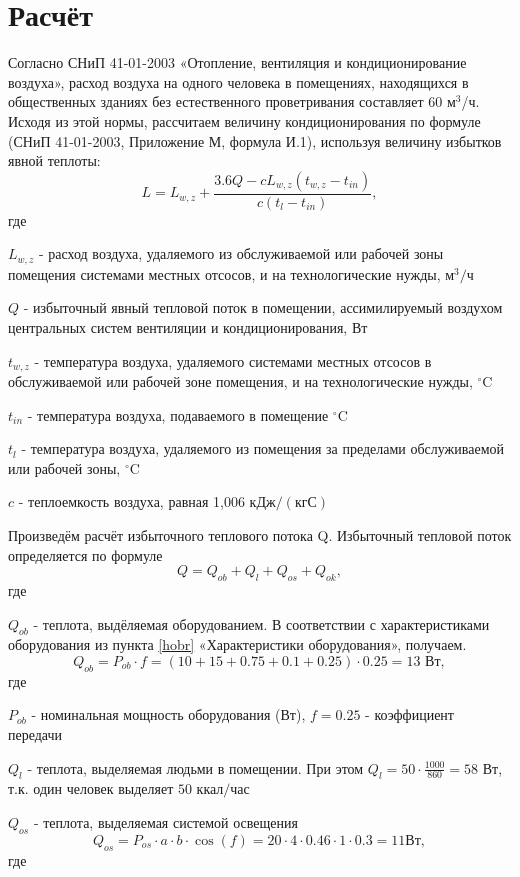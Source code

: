 \section{Расчёт}

Согласно СНиП 41-01-2003 «Отопление, вентиляция и кондиционирование воздуха», расход воздуха на одного человека в помещениях, находящихся в общественных зданиях без естественного проветривания составляет 60 м$^3$/ч. Исходя из этой нормы, рассчитаем величину кондиционирования по формуле (СНиП 41-01-2003, Приложение М, формула И.1), используя величину из\-бытков явной теплоты:
$$
L = L_{w,z} + \frac{3.6Q - cL_{w,z}(t_{w,z} - t_{in})}{c(t_{l}-t_{in})},
$$
где

$L_{w,z}$ - расход воздуха, удаляемого из обслуживаемой или рабочей зоны помещения системами местных отсосов, и на технологические нужды,  $\mbox{м}^3/\mbox{ч}$

$Q$ - избыточный явный тепловой поток в помещении, ассимилируемый воздухом центральных систем вентиляции и кондиционирования, Вт

$t_{w,z}$ - температура воздуха, удаляемого системами местных отсосов в об\-служиваемой или рабочей зоне помещения, и на технологические нужды, $^\circ$C

$t_{in}$ - температура воздуха, подаваемого в помещение $^\circ$C

$t_{l}$ - температура воздуха, удаляемого из помещения за пределами обслу\-живаемой или рабочей зоны, $^\circ$C

$c$ - теплоемкость воздуха, равная 1,006 $\mbox{кДж}/(\mbox{кгС})$

Произведём расчёт избыточного теплового потока Q. Избыточный тепло\-вой поток определяется по формуле
$$
Q = Q_{ob} + Q_{l} + Q_{os} + Q_{ok},
$$
где 

$Q_{ob}$ - теплота, выдёляемая оборудованием. В соответствии с характерис\-тиками обору\-дования из пункта \ref{hobr} «Характеристики оборудования», по\-лучаем.
$$
Q_{ob} = P_{ob}\cdot f = (10+15+0.75+0.1+0.25)\cdot 0.25 = 13 \mbox{ Вт},
$$
где

$P_{ob}$ - номинальная мощность оборудования (Вт), $f=0.25$ - коэффициент передачи

 $Q_{l}$ - теплота, выделяемая людьми в помещении. При этом $Q_{l} = 50\cdot \frac{1000}{860} = 58 \mbox{ Вт}$, т.к. один человек выделяет $50 \mbox{ ккал/час}$

$Q_{os}$ - теплота, выделяемая системой освещения
$$
Q_{os} = P_{os} \cdot a \cdot b \cdot \cos(f) = 20 \cdot 4 \cdot 0.46 \cdot 1 \cdot 0.3 = 11 \mbox{Вт},
$$
где

